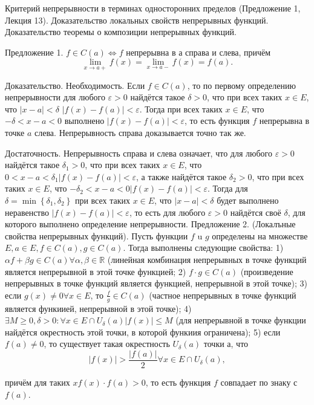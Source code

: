 \begin{problem}
Критерий непрерывности в терминах односторонних пределов (Предложение 1, Лекция
13). Доказательство локальных свойств непрерывных функций. Доказательство теоремы
о композиции непрерывных функций.
\end{problem}
Предложение 1. $f \in C(a) \Leftrightarrow f$ непрерывна в а справа и слева, причём
$$
\lim _{x \rightarrow a+} f(x)=\lim _{x \rightarrow a-} f(x)=f(a) .
$$

Доказательство. Необходимость. Если $f \in C(a)$, то по первому определению непрерывности для любого $\varepsilon>0$ найдётся такое $\delta>0$, что при всех таких $x \in E$, что $|x-a|<\delta$ $|f(x)-f(a)|<\varepsilon$. Тогда при всех таких $x \in E$, что $-\delta<x-a<0$ выполнено $|f(x)-f(a)|<\varepsilon$, то есть функция $f$ непрерывна в точке $a$ слева. Непрерывность справа доказывается точно так же.

Достаточность. Непрерывность справа и слева означает, что для любого $\varepsilon>0$ найдётся такое $\delta_1>0$, что при всех таких $x \in E$, что $0<x-a<\delta_1|f(x)-f(a)|<\varepsilon$, а также найдётся такое $\delta_2>0$, что при всех таких $x \in E$, что $-\delta_2<x-a<0|f(x)-f(a)|<\varepsilon$. Тогда для $\delta=\min \left\{\delta_1, \delta_2\right\}$ при всех таких $x \in E$, что $|x-a|<\delta$ будет выполнено неравенство $|f(x)-f(a)|<\varepsilon$, то есть для любого $\varepsilon>0$ найдётся своё $\delta$, для которого выполнено определение непрерывности.
Предложение 2. (Локалъные свойства непрерывных функций). Пусть функции $f$ u $g$ определены на множестве $E, a \in E, f \in C(a), g \in C(a)$. Тогда выполнены следующие свойства:
1) $\alpha f+\beta g \in C(a) \forall \alpha, \beta \in \mathbb{R}$ (линейная комбинация непрерывных в точке функций является непрерывной в этой точке функцией;
2) $f \cdot g \in C(a)$ (произведение непрерывных в точке функций является функцией, непрерывной в этой точке);
3) если $g(x) \neq 0 \forall x \in E$, то $\frac{f}{g} \in C(a)$ (частное непрерывных в точке функций является функиией, непрерывной в этой точке);
4) $\exists M \geq 0, \delta>0: \forall x \in E \cap U_\delta(a)|f(x)| \leq M$ (для непрерывной в точке функции найдётся окрестность этой точки, в которой функиия ограничена);
5) если $f(a) \neq 0$, то существует такая окрестность $U_\delta(a)$ точки $а$, что
$$
|f(x)|>\frac{|f(a)|}{2} \forall x \in E \cap U_\delta(a),
$$

причём для таких $x f(x) \cdot f(a)>0$, то есть функция $f$ совпадает по знаку с $f(a)$.

